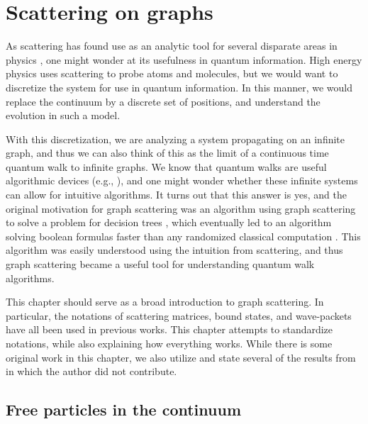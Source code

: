 \documentclass[../thesis-main/thesis-main]{subfiles}
\begin{document}
\chapter{Scattering on graphs}
\label{chap:scattering_on_graphs}


As scattering has found use as an analytic tool for several disparate areas in physics \cite{RSScat}, one might wonder at its usefulness in quantum information.  High energy physics uses scattering to probe atoms and molecules, but we would want to discretize the system for use in quantum information.  In this manner, we would replace the continuum by a discrete set of positions, and understand the evolution in such a model.

With this discretization, we are analyzing a system propagating on an infinite graph, and thus we can also think of this as the limit of a continuous time quantum walk to infinite graphs.  We know that quantum walks are useful algorithmic devices (e.g., \cite{CCDFGS03,Amb07}), and one might wonder whether these infinite systems can allow for intuitive algorithms.  It turns out that this answer is yes, and the original motivation for graph scattering was an algorithm using graph scattering to solve a problem for decision trees \cite{FG98}, which eventually led to an algorithm solving boolean formulas faster than any randomized classical computation \cite{FGG08}.  This algorithm was easily understood using the intuition from scattering, and thus graph scattering became a useful tool for understanding quantum walk algorithms.

This chapter should serve as a broad introduction to graph scattering.  In particular, the notations of scattering matrices, bound states, and wave-packets have all been used in previous works.  This chapter attempts to standardize notations, while also explaining how everything works.  While there is some original work in this chapter, we also utilize and state several of the results from \cite{FGG08,Chi09,CS11,CG12} in which the author did not contribute.

\section{Free particles in the continuum}
\end{document}
